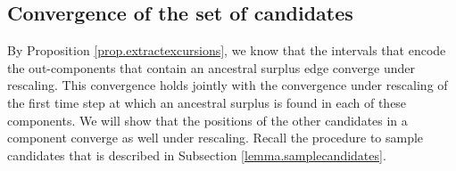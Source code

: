 
\subsection{Convergence of the set of candidates}
By Proposition \ref{prop.extractexcursions}, we know that the intervals that encode the out-components that contain an ancestral surplus edge converge under rescaling. This convergence holds jointly with the convergence under rescaling of the first time step at which an ancestral surplus is found in each of these components. We will show that the positions of the other candidates in a component converge as well under rescaling. Recall the procedure to sample candidates that is described in Subsection \ref{lemma.samplecandidates}. 


